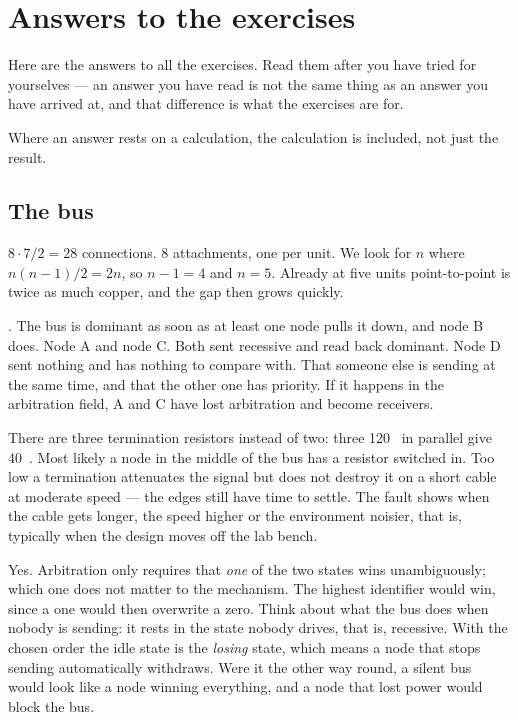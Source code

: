\chapter{Answers to the exercises}
\label{ch:svar}

Here are the answers to all the exercises. Read them after you have tried for yourselves --- an
answer you have read is not the same thing as an answer you have arrived at, and that difference is
what the exercises are for.

Where an answer rests on a calculation, the calculation is included, not just the result.

\section{The bus}

 $8 \cdot 7 / 2 = 28$ connections.
 8 attachments, one per unit.
 We look for $n$ where $n(n-1)/2 = 2n$, so $n - 1 = 4$ and $n = 5$. Already at five units
point-to-point is twice as much copper, and the gap then grows quickly.

 \dom. The bus is dominant as soon as at least one node pulls it down, and node B does.
 Node A and node C. Both sent recessive and read back dominant. Node D sent nothing and has
nothing to compare with.
 That someone else is sending at the same time, and that the other one has priority. If it
happens in the arbitration field, A and C have lost arbitration and become receivers.

 There are three termination resistors instead of two: three 120~\textohm{} in parallel give
40~\textohm. Most likely a node in the middle of the bus has a resistor switched in.
 Too low a termination attenuates the signal but does not destroy it on a short cable at
moderate speed --- the edges still have time to settle. The fault shows when the cable gets longer,
the speed higher or the environment noisier, that is, typically when the design moves off the lab
bench.

 Yes. Arbitration only requires that \emph{one} of the two states wins unambiguously; which
one does not matter to the mechanism.
 The highest identifier would win, since a one would then overwrite a zero.
 Think about what the bus does when nobody is sending: it rests in the state nobody drives,
that is, recessive. With the chosen order the idle state is the \emph{losing} state, which means a
node that stops sending automatically withdraws. Were it the other way round, a silent bus would
look like a node winning everything, and a node that lost power would block the bus.

